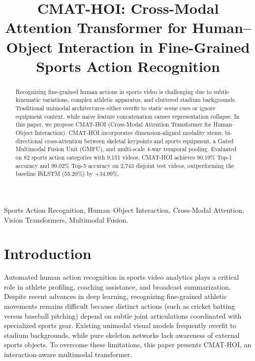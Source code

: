 \documentclass[conference]{IEEEtran}
\begin{document}
\title{CMAT-HOI: Cross-Modal Attention Transformer for Human--Object Interaction in Fine-Grained Sports Action Recognition}

\author{
}

\maketitle

\begin{abstract}
Recognizing fine-grained human actions in sports video is challenging due to subtle kinematic variations, complex athletic apparatus, and cluttered stadium backgrounds. Traditional unimodal architectures either overfit to static scene cues or ignore equipment context, while naive feature concatenation causes representation collapse. In this paper, we propose CMAT-HOI (Cross-Modal Attention Transformer for Human--Object Interaction). CMAT-HOI incorporates dimension-aligned modality stems, bi-directional cross-attention between skeletal keypoints and sports equipment, a Gated Multimodal Fusion Unit (GMFU), and multi-scale 4-way temporal pooling. Evaluated on 82 sports action categories with 9,151 videos, CMAT-HOI achieves 90.19\% Top-1 accuracy and 99.02\% Top-5 accuracy on 2,743 disjoint test videos, outperforming the baseline BiLSTM (55.20\%) by +34.99\%.
\end{abstract}

\begin{IEEEkeywords}
Sports Action Recognition, Human--Object Interaction, Cross-Modal Attention, Vision Transformers, Multimodal Fusion.
\end{IEEEkeywords}

\section{Introduction}
Automated human action recognition in sports video analytics plays a critical role in athlete profiling, coaching assistance, and broadcast summarization. Despite recent advances in deep learning, recognizing fine-grained athletic movements remains difficult because distinct actions (such as cricket batting versus baseball pitching) depend on subtle joint articulations coordinated with specialized sports gear. Existing unimodal visual models frequently overfit to stadium backgrounds, while pure skeleton networks lack awareness of external sports objects. To overcome these limitations, this paper presents CMAT-HOI, an interaction-aware multimodal transformer.
\end{document}
